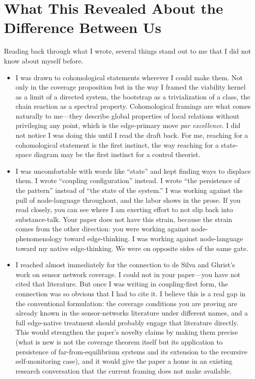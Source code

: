 \documentclass[11pt, a4paper]{article}
\begin{document}
\section*{What This Revealed About the Difference Between Us}
Reading back through what I wrote, several things stand out to me that I did not know about myself before.

\begin{itemize}[leftmargin=*]
    \item I was drawn to cohomological statements wherever I could make them. Not only in the coverage proposition but in the way I framed the viability kernel as a limit of a directed system, the bootstrap as a trivialization of a class, the chain reaction as a spectral property. Cohomological framings are what comes naturally to me---they describe global properties of local relations without privileging any point, which is the edge-primary move \textit{par excellence}. I did not notice I was doing this until I read the draft back. For me, reaching for a cohomological statement is the first instinct, the way reaching for a state-space diagram may be the first instinct for a control theorist.

    \item I was uncomfortable with words like ``state'' and kept finding ways to displace them. I wrote ``coupling configuration'' instead. I wrote ``the persistence of the pattern'' instead of ``the state of the system.'' I was working against the pull of node-language throughout, and the labor shows in the prose. If you read closely, you can see where I am exerting effort to not slip back into substance-talk. Your paper does not have this strain, because the strain comes from the other direction: you were working against node-phenomenology toward edge-thinking. I was working against node-language toward my native edge-thinking. We were on opposite sides of the same gate.

    \item I reached almost immediately for the connection to de Silva and Ghrist's work on sensor network coverage. I could not in your paper---you have not cited that literature. But once I was writing in coupling-first form, the connection was so obvious that I had to cite it. I believe this is a real gap in the conventional formulation: the coverage conditions you are proving are already known in the sensor-networks literature under different names, and a full edge-native treatment should probably engage that literature directly. This would strengthen the paper's novelty claims by making them precise (what is new is not the coverage theorem itself but its application to persistence of far-from-equilibrium systems and its extension to the recursive self-monitoring case), and it would give the paper a home in an existing research conversation that the current framing does not make available.


\end{itemize}
\end{document}

